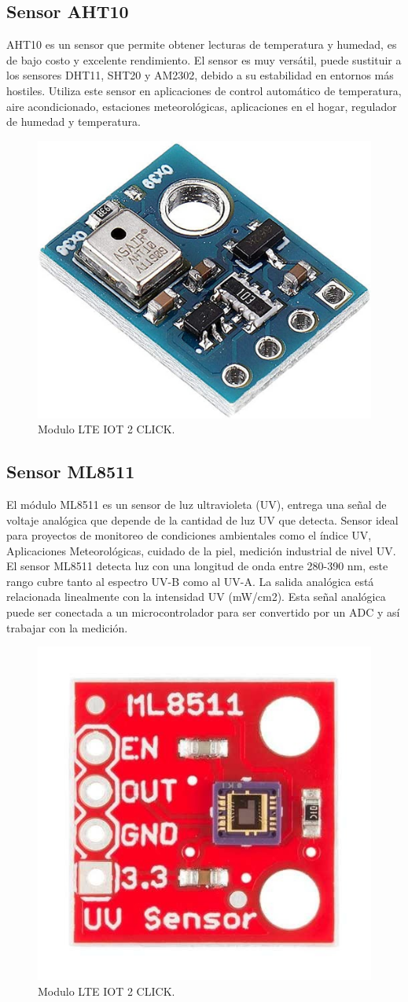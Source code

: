 \subsection{Sensor AHT10}
AHT10 es un sensor que permite obtener lecturas de temperatura y humedad, es de bajo costo y excelente rendimiento. El sensor es muy versátil, puede sustituir a los sensores DHT11, SHT20 y AM2302, debido a su estabilidad en entornos más hostiles. Utiliza este sensor en aplicaciones de control automático de temperatura, aire acondicionado, estaciones meteorológicas, aplicaciones en el hogar, regulador de humedad y temperatura.
\begin{figure}[htbp]
	\centering
	\includegraphics[width=.4\textwidth]{./Figures/aht10.jpg}
	\caption{Modulo LTE IOT 2 CLICK.}
\end{figure}

\subsection{Sensor ML8511}

El módulo ML8511 es un sensor de luz ultravioleta (UV), entrega una señal de voltaje analógica que depende de la cantidad de luz UV que detecta. Sensor ideal para proyectos de monitoreo de condiciones ambientales como el índice UV, Aplicaciones Meteorológicas, cuidado de la piel, medición industrial de nivel UV.
El sensor ML8511 detecta luz con una longitud de onda entre 280-390 nm, este rango cubre tanto al espectro UV-B como al UV-A. La salida analógica está relacionada linealmente con la intensidad UV (mW/cm2). Esta señal analógica puede ser conectada a un microcontrolador para ser convertido por un ADC y así trabajar con la medición. 
\begin{figure}[htbp]
	\centering
	\includegraphics[width=.4\textwidth]{./Figures/ml8511.jpg}
	\caption{Modulo LTE IOT 2 CLICK.}
\end{figure}
